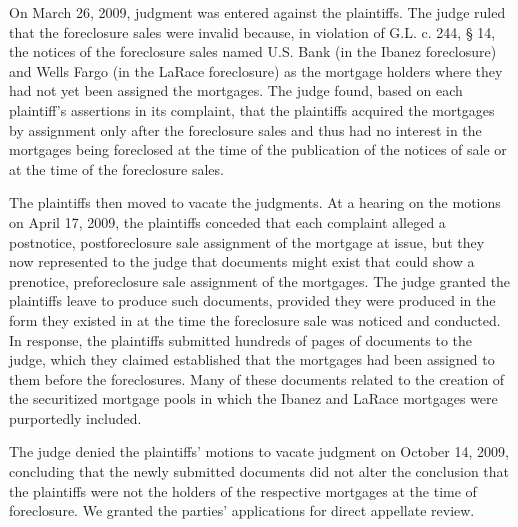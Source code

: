 On March 26, 2009, judgment was entered against the plaintiffs. The judge ruled
that the foreclosure sales were invalid because, in violation of G.L. c. 244,
{\S} 14, the notices of the foreclosure sales named U.S. Bank (in the Ibanez
foreclosure) and Wells Fargo (in the LaRace foreclosure) as the mortgage
holders where they had not yet been assigned the mortgages. The judge found,
based on each plaintiff's assertions in its complaint, that the plaintiffs
acquired the mortgages by assignment only after the foreclosure sales and thus
had no interest in the mortgages being foreclosed at the time of the
publication of the notices of sale or at the time of the foreclosure
sales.

The plaintiffs then moved to vacate the judgments. At a hearing on the motions
on April 17, 2009, the plaintiffs conceded that each complaint alleged a
postnotice, postforeclosure sale assignment of the mortgage at issue, but they
now represented to the judge that documents might exist that could show a
prenotice, preforeclosure sale assignment of the mortgages. The judge granted
the plaintiffs leave to produce such documents, provided they were produced in
the form they existed in at the time the foreclosure sale was noticed and
conducted. In response, the plaintiffs submitted hundreds of pages of documents
to the judge, which they claimed established that the mortgages had been
assigned to them before the foreclosures. Many of these documents related to
the creation of the securitized mortgage pools in which the Ibanez and LaRace
mortgages were purportedly included. 

The judge denied the plaintiffs' motions to vacate judgment on October 14, 2009,
concluding that the newly submitted documents did not alter the conclusion that
the plaintiffs were not the holders of the respective mortgages at the time of
foreclosure. We granted the parties' applications for direct appellate review.

